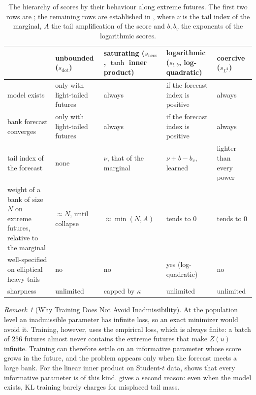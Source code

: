\documentclass[11pt]{article}
\theoremstyle{plain}
\theoremstyle{definition}
\theoremstyle{remark}
\newtheorem{remark}[theorem]{Remark}
\newcommand{\sdot}{s_{\mathrm{dot}}}
\newcommand{\sncos}{s_{\mathrm{ncos}}}
\newcommand{\sltwo}{s_{L^2}}
\begin{document}
\begin{table}[ht]
 \centering
 \small
 \begin{tabular}{>{\raggedright\arraybackslash}p{2.9cm}>{\raggedright\arraybackslash}p{2.6cm}>{\raggedright\arraybackslash}p{3.0cm}>{\raggedright\arraybackslash}p{2.6cm}>{\raggedright\arraybackslash}p{2.6cm}}
  \toprule
                          & unbounded ($\sdot$)             & saturating ($\sncos$, $\tanh$ inner product)                 & logarithmic ($s_{t,b}$, log-quadratic) & coercive ($\sltwo$) \\
  \midrule
  model exists            & only with light-tailed futures  & always                                                       & if the forecast index is positive      & always              \\
  bank forecast converges & only with light-tailed futures  & always                                                       & if the forecast index is positive      & always              \\
  tail index of the forecast & none                         & $\nu$, that of the marginal                                  & $\nu+b-b_v$, learned                   & lighter than every power \\
  weight of a bank of size $N$ on extreme futures, relative to the marginal & $\approx N$, until collapse & $\approx\min(N,A)$ & tends to $0$ & tends to $0$ \\
  well-specified on elliptical heavy tails & no             & no                                                           & yes (log-quadratic)                    & no                  \\
  sharpness               & unlimited                       & capped by $\kappa$                                           & unlimited                              & unlimited           \\
  \bottomrule
 \end{tabular}
 \caption{The hierarchy of scores by their behaviour along extreme futures.
  The first two rows are ; the
  remaining rows are established in , where $\nu$ is
  the tail index of the marginal, $A$ the tail amplification of the score
  and $b,b_v$ the exponents of the logarithmic scores.}
 \label{tab:hierarchy}
\end{table}

\begin{remark}[Why Training Does Not Avoid Inadmissibility]
 \label{rem:training}
 At the population level an inadmissible parameter has infinite loss, so an
 exact minimizer would avoid it. Training, however, uses the empirical loss,
 which is always finite: a batch of $256$ futures almost never contains the
 extreme futures that make $Z(u)$ infinite. Training can therefore settle on
 an informative parameter whose score grows in the future, and the problem
 appears only when the forecast meets a large bank. For the linear inner
 product on Student-$t$ data,  shows that every informative
 parameter is of this kind.  gives a second reason: even
 when the model exists, KL training barely charges for misplaced tail mass.
\end{remark}
\end{document}
